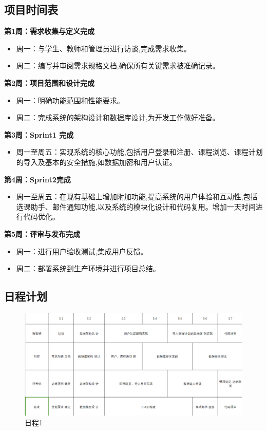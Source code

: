 \documentclass{article}
\begin{document}
\subsection{项目时间表}
\textbf{第1周：需求收集与定义完成}
\begin{itemize}
\item 周一：与学生、教师和管理员进行访谈,完成需求收集。
\item 周二：编写并审阅需求规格文档,确保所有关键需求被准确记录。
\end{itemize}

\textbf{第2周：项目范围和设计完成}
\begin{itemize}
\item 周一：明确功能范围和性能要求。
\item 周二：完成系统的架构设计和数据库设计,为开发工作做好准备。
\end{itemize}

\textbf{第3周：Sprint1 完成}
\begin{itemize}
\item 周一至周五：实现系统的核心功能,包括用户登录和注册、课程浏览、课程计划的导入及基本的安全措施,如数据加密和用户认证。
\end{itemize}

\textbf{第4周：Sprint2完成}
\begin{itemize}
\item 周一至周五：在现有基础上增加附加功能,提高系统的用户体验和互动性,包括选课助手、邮件通知功能,以及系统的模块化设计和代码复用。增加一天时间进行代码优化。
\end{itemize}

\textbf{第5周：评审与发布完成}
\begin{itemize}
\item 周一：进行用户验收测试,集成用户反馈。
\item 周二：部署系统到生产环境并进行项目总结。
\end{itemize}
\subsection{日程计划}
\begin{figure}[h]
	\centering
	\includegraphics[width=\textwidth]{日程1.png}
	\caption{日程1}
	\label{fig:schedule1}
	\end{figure}
	
\end{document}
